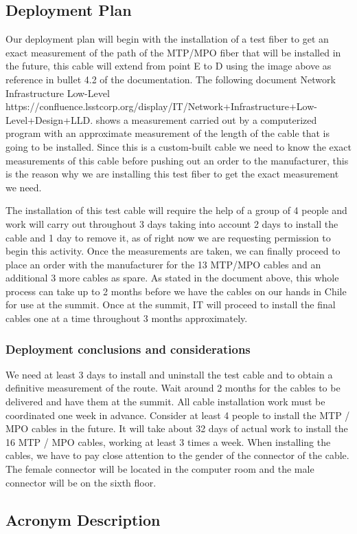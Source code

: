 \subsection{Deployment Plan}

Our deployment plan will begin with the installation of a test fiber to get an exact measurement of the path of the MTP/MPO fiber that will be installed in the future, this cable will extend from point E to D using the image above as reference in bullet 4.2 of the documentation. The following document Network Infrastructure Low-Level https://confluence.lsstcorp.org/display/IT/Network+Infrastructure+Low-Level+Design+LLD. shows a measurement carried out by a computerized program with an approximate measurement of the length of the cable that is going to be installed. Since this is a custom-built cable we need to know the exact measurements of this cable before pushing out an order to the manufacturer, this is the reason why we are installing this test fiber to get the exact measurement we need. 


The installation of this test cable will require the help of a group of 4 people and work will carry out throughout 3 days taking into account 2 days to install the cable and 1 day to remove it, as of right now we are requesting permission to begin this activity. Once the measurements are taken, we can finally proceed to place an order with the manufacturer for the 13 MTP/MPO cables and an additional 3 more cables as spare. As stated in the document above, this whole process can take up to 2 months before we have the cables on our hands in Chile for use at the summit. Once at the summit, IT will proceed to install the final cables one at a time throughout 3 months approximately.

\subsubsection{Deployment conclusions and considerations}

    We need at least 3 days to install and uninstall the test cable and to obtain a definitive measurement of the route.
    Wait around 2 months for the cables to be delivered and have them at the summit.
    All cable installation work must be coordinated one week in advance.
    Consider at least 4 people to install the MTP / MPO cables in the future.
    It will take about 32 days of actual work to install the 16 MTP / MPO cables, working at least 3 times a week.
    When installing the cables, we have to pay close attention to the gender of the connector of the cable.  The female connector will be located in the computer room and the male connector will be on the sixth floor.

\subsection{Acronym Description}











